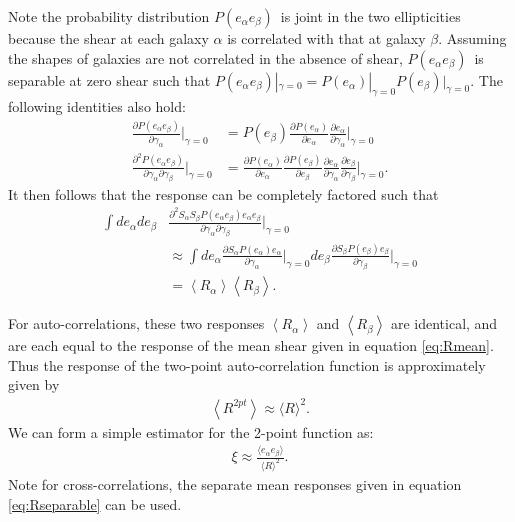\documentclass[a4paper,fleqn,usenatbib]{mnras}
\newcommand{\mcalRmean}{$\langle R \rangle$}
\newcommand{\probe}{$P(e_\alpha e_\beta)$}
\begin{document}
Note the probability distribution \probe\ is joint in the two ellipticities
because the shear at each galaxy $\alpha$ is correlated with that at galaxy
$\beta$. Assuming the shapes of galaxies are not correlated in the absence of
shear, \probe\ is separable at zero shear such that $\mbox{\probe}|_{\gamma=0}
= P(e_\alpha)|_{\gamma=0} P(e_\beta)|_{\gamma=0}$.  The following identities
also hold:
\begin{align}
    \frac{\partial \mbox{\probe}}{\partial \gamma_\alpha}\bigg|_{\gamma=0} &= P(e_\beta) \frac{\partial P(e_\alpha) }{\partial e_\alpha} \frac{\partial e_\alpha}{\partial \gamma_\alpha}\bigg|_{\gamma=0} \nonumber \\
    \frac{\partial^2 \mbox{\probe}}{\partial \gamma_\alpha \partial \gamma_\beta}\bigg|_{\gamma=0} &= \frac{\partial P(e_\alpha) }{\partial e_\alpha} \frac{\partial P(e_\beta) }{\partial e_\beta}  \frac{\partial e_\alpha}{\partial \gamma_\alpha} \frac{\partial e_\beta}{\partial \gamma_\beta}\bigg|_{\gamma=0}.
\end{align}
It then follows that the response can be completely factored such that
\begin{align} \label{eq:Rseparable}
    \int d e_\alpha  de_\beta  & \frac{\partial^2 S_\alpha S_\beta \mbox{\probe} e_\alpha e_\beta}{\partial \gamma_\alpha \partial \gamma_\beta}\bigg|_{\gamma=0}  \nonumber \\
      & \approx \int d e_\alpha  \frac{\partial S_\alpha P(e_\alpha) e_\alpha}{\partial \gamma_\alpha}\bigg|_{\gamma=0} de_\beta   \frac{\partial S_\beta P(e_\beta) e_\beta}{\partial \gamma_\beta}\bigg|_{\gamma=0} \nonumber \\
      &=  \left< R_\alpha \right> \left< R_\beta \right>.
\end{align}

For auto-correlations, these two responses $\left< R_\alpha \right>$ and
$\left< R_\beta \right>$ are identical, and are each equal to the
response of the mean shear given in equation \ref{eq:Rmean}.  Thus the response
of the two-point auto-correlation function is approximately given by
\begin{align}
    \left< R^{2pt} \right> \approx \mbox{\mcalRmean}^2.
\end{align}
We can form a simple estimator for the 2-point function as:
\begin{align}
    \xi \approx \frac{ \langle e_\alpha e_\beta \rangle }{\mbox{\mcalRmean}^2}.
\end{align}
Note for cross-correlations, the separate mean responses given in equation
\ref{eq:Rseparable} can be used.
\end{document}
